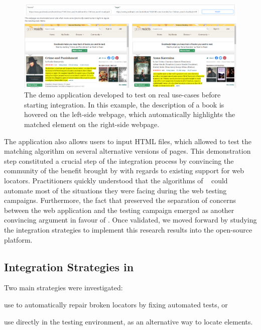 \documentclass[10pt,conference]{IEEEtran}
\begin{document}
\begin{figure}[]
    \centering
    \includegraphics[width=\linewidth]{explanations/demo_matching}
    \caption{The demo application developed to test \erratum on real use-cases before starting integration. In this example, the description of a book is hovered on the left-side webpage, which automatically highlights the matched element on the right-side webpage.}
    \label{fig:demo_app}
\end{figure}

The application also allows users to input HTML files, which allowed to test the matching algorithm on several alternative versions of pages.
This demonstration step constituted a crucial step of the integration process by convincing the \cerberus community of the benefit brought by \erratum with regards to existing support for web locators.
Practitioners quickly understood that the algorithms of \erratum~\cite{brisset2021erratum,brisset2020sftm} could automate most of the situations they were facing during the web testing campaigns.
Furthermore, the fact that \erratum preserved the separation of concerns between the web application and the testing campaign emerged as another convincing argument in favour of \erratum.
Once validated, we moved forward by studying the integration strategies to implement this research results into the open-source platform.

\subsection{Integration Strategies in \cerberus}
Two main strategies were investigated:
\begin{inparaenum}[\em (i)]
\item use \erratum to automatically repair broken locators by fixing automated tests, or
\item use \erratum directly in the \cerberus testing environment, as an alternative way to locate elements.
\end{inparaenum}
\end{document}
